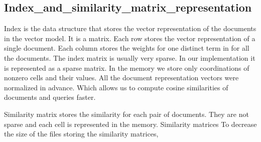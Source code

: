 \subsection {Index_and_similarity_matrix_representation}
\label{sec:Index_and_similarity_matrix_representation}

Index is the data structure that stores the vector representation of the documents in the vector model. It is a matrix. Each row stores the vector representation of a single document. Each column stores the weights for one distinct term in for all the documents. The index matrix is usually very sparse. In our implementation it is represented as a sparse matrix. In the memory we store only coordinations of nonzero cells and their values. All the document representation vectors were normalized in advance. Which allows us to compute cosine similarities of documents and queries faster.

Similarity matrix stores the similarity for each pair of documents. They are not sparse and each cell is represented in the memory. Similarity matrices To decrease the size of the files storing the similarity matrices, 
